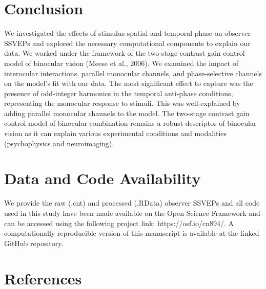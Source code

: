 \documentclass[review,
  12pt,
]{elsarticle}
\begin{document}
\section{Conclusion}\label{conclusion}

We investigated the effects of stimulus spatial and temporal phase on
observer SSVEPs and explored the necessary computational components to
explain our data. We worked under the framework of the two-stage
contrast gain control model of binocular vision (Meese et al., 2006). We
examined the impact of interocular interactions, parallel monocular
channels, and phase-selective channels on the model's fit with our data.
The most significant effect to capture was the presence of odd-integer
harmonics in the temporal anti-phase conditions, representing the
monocular response to stimuli. This was well-explained by adding
parallel monocular channels to the model. The two-stage contrast gain
control model of binocular combination remains a robust descriptor of
binocular vision as it can explain various experimental conditions and
modalities (psychophysics and neuroimaging).

\section{Data and Code Availability}\label{data-and-code-availability}

We provide the raw (.cnt) and processed (.RData) observer SSVEPs and all
code used in this study have been made available on the Open Science
Framework and can be accessed using the following project link:
https://osf.io/cn894/. A computationally reproducible version of this
manuscript is available at the linked GitHub repository.

\section*{References}\label{references}
\end{document}

